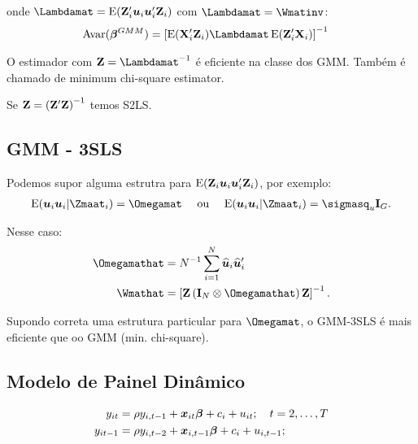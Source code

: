 \documentclass[11pt, oneside, a4paper, article]{article}
\numberwithin{equation}{section}
\begin{document}
\begin{description}
\noindent
onde $\Lambdamat = \E(\Zmat_{i}'\uvec_{i} \uvec_{i}' \Zmat_{i})$ com $\Lambdamat = \Wmatinv$:
\begin{align*}
\Avar( \betavec^{GMM} ) &=
\left[ \E( \Xmat_{i}'\Zmat_{i})	\Lambdamat \, \E( \Zmat_{i}'\Xmat_{i}) \right]^{-1}
\end{align*}

O estimador com $\Wmat = \Lambdamat^{-1}$ é eficiente na classe dos GMM.
Também é chamado de minimum chi-square estimator.

\begin{obs}
	Se $\mathbf{Z} = \left( \mathbf{Z}'\mathbf{Z} \right)^{-1}$ temos S2LS.	
\end{obs}

\subsection{GMM - 3SLS} 

Podemos supor alguma estrutra para $\text{E}( \mathbf{Z}_{i} \boldsymbol{u}_{i} \boldsymbol{u}_{i}' \mathbf{Z}_{i})$, por exemplo:
\begin{align*}
	\E(\uvec_{i} \uvec_{i} | \Zmaat_{i}) = \Omegamat
	\quad \text{ ou } \quad
	\E(\uvec_{i} \uvec_{i} | \Zmaat_{i}) = \sigmasq_{u} \Imat_{G}.
\end{align*}

Nesse caso:
\begin{align*}
	\Omegamathat &= N^{-1} \sum_{i=1}^{N} \uvechat_{i} \uvechat_{i}'
	\\
	\Wmathat &= \left[ \Zmat \left( \Imat_{N} \otimes \Omegamathat \right) \Zmat \right]^{-1}.
\end{align*}

Supondo correta uma estrutura particular para $\Omegamat$, o GMM-3SLS é mais eficiente que oo GMM (min. chi-square).

\subsection{Modelo de Painel Dinâmico} 

\vspace{-2 em}
\begin{align*}
y_{it} &= \rho y_{i,t-1} + \boldsymbol{x}_{it} \boldsymbol{\beta} + c_{i} + u_{it}; 
\quad t=2, \dots, T
\\
y_{it-1} &= \rho y_{i,t-2} + \boldsymbol{x}_{i,t-1} \boldsymbol{\beta} + c_{i} + u_{i,t-1}; 
\end{align*}


\end{description}
\end{document}
